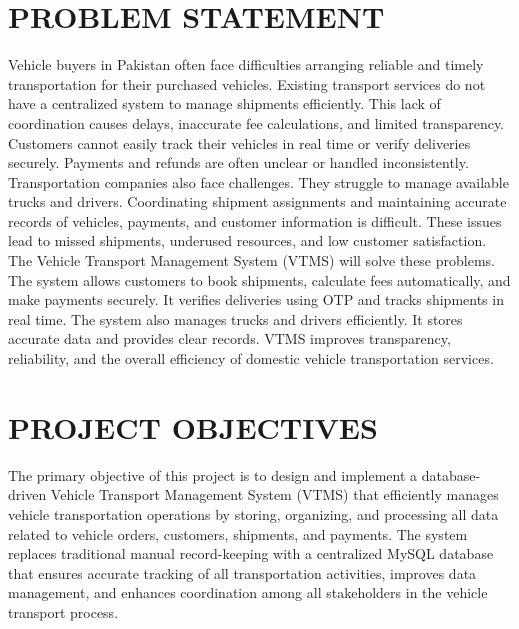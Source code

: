 \documentclass[12pt,a4paper]{report}
\begin{document}
\section{PROBLEM STATEMENT}

Vehicle buyers in Pakistan often face difficulties arranging reliable and timely transportation for their purchased vehicles. Existing transport services do not have a centralized system to manage shipments efficiently. This lack of coordination causes delays, inaccurate fee calculations, and limited transparency. Customers cannot easily track their vehicles in real time or verify deliveries securely. Payments and refunds are often unclear or handled inconsistently.
Transportation companies also face challenges. They struggle to manage available trucks and drivers. Coordinating shipment assignments and maintaining accurate records of vehicles, payments, and customer information is difficult. These issues lead to missed shipments, underused resources, and low customer satisfaction.
The Vehicle Transport Management System (VTMS) will solve these problems. The system allows customers to book shipments, calculate fees automatically, and make payments securely. It verifies deliveries using OTP and tracks shipments in real time. The system also manages trucks and drivers efficiently. It stores accurate data and provides clear records. VTMS improves transparency, reliability, and the overall efficiency of domestic vehicle transportation services.

\section{PROJECT OBJECTIVES}

The primary objective of this project is to design and implement a database-driven Vehicle Transport Management System (VTMS) that efficiently manages vehicle transportation operations by storing, organizing, and processing all data related to vehicle orders, customers, shipments, and payments. The system replaces traditional manual record-keeping with a centralized MySQL database that ensures accurate tracking of all transportation activities, improves data management, and enhances coordination among all stakeholders in the vehicle transport process.
\end{document}
